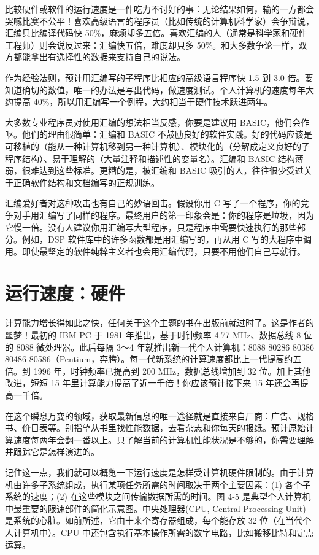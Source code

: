 比较硬件或软件的运行速度是一件吃力不讨好的事：无论结果如何，输的一方都会哭喊比赛不公平！喜欢高级语言的程序员（比如传统的计算机科学家）会争辩说，汇编只比编译代码快
50\%，麻烦却多五倍。喜欢汇编的人（通常是科学家和硬件工程师）则会说反过来：汇编快五倍，难度却只多
50\%。和大多数争论一样，双方都能拿出有选择性的数据来支持自己的说法。

作为经验法则，预计用汇编写的子程序比相应的高级语言程序快 1.5 到 3.0
倍。要知道确切的数值，唯一的办法是写出代码，做速度测试。个人计算机的速度每年大约提高
40\%，所以用汇编写一个例程，大约相当于硬件技术跃进两年。

大多数专业程序员对使用汇编的想法相当反感，你要是建议用
BASIC，他们会作呕。他们的理由很简单：汇编和 BASIC
不鼓励良好的软件实践。好的代码应该是可移植的（能从一种计算机移到另一种计算机）、模块化的（分解成定义良好的子程序结构）、易于理解的（大量注释和描述性的变量名）。汇编和
BASIC 结构薄弱，很难达到这些标准。更糟的是，被汇编和 BASIC
吸引的人，往往很少受过关于正确软件结构和文档编写的正规训练。

汇编爱好者对这种攻击也有自己的妙语回击。假设你用 C
写了一个程序，你的竞争对手用汇编写了同样的程序。最终用户的第一印象会是：你的程序是垃圾，因为它慢一倍。没有人建议你用汇编写大型程序，只是程序中需要快速执行的那些部分。例如，DSP
软件库中的许多函数都是用汇编写的，再从用 C
写的大程序中调用。即使最坚定的软件纯粹主义者也会用汇编代码，只要不用他们自己写就行。

\section{运行速度：硬件}

计算能力增长得如此之快，任何关于这个主题的书在出版前就过时了。这是作者的噩梦！最初的
IBM PC 于 1981 年推出，基于时钟频率 4.77 MHz、数据总线 8 位的 8088
微处理器。此后每隔 3～4 年就推出新一代个人计算机：8088  80286
 80386  80486 
80586（Pentium，奔腾）。每一代新系统的计算速度都比上一代提高约五倍。到
1996 年，时钟频率已提高到 200 MHz，数据总线增加到 32
位。加上其他改进，短短 15 年里计算能力提高了近一千倍！你应该预计接下来
15 年还会再提高一千倍。

在这个瞬息万变的领域，获取最新信息的唯一途径就是直接来自厂商：广告、规格书、价目表等。别指望从书里找性能数据，去看杂志和你每天的报纸。预计原始计算速度每两年会翻一番以上。只了解当前的计算机性能状况是不够的，你需要理解并跟踪它是怎样演进的。

记住这一点，我们就可以概览一下运行速度是怎样受计算机硬件限制的。由于计算机由许多子系统组成，执行某项任务所需的时间取决于两个主要因素：(1)
各个子系统的速度；(2) 在这些模块之间传输数据所需的时间。图 4-5
是典型个人计算机中最重要的限速部件的简化示意图。中央处理器(CPU, Central
Processing Unit)是系统的心脏。如前所述，它由十来个寄存器组成，每个能存放
32 位（在当代个人计算机中）。CPU
中还包含执行基本操作所需的数字电路，比如搬移比特和定点运算。

